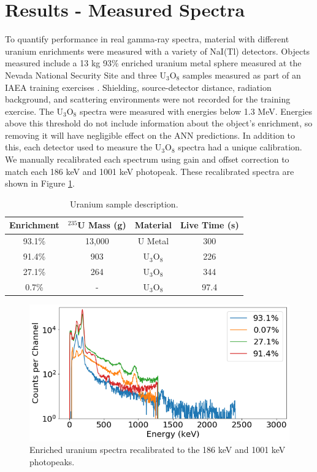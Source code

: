 \section{Results - Measured Spectra}

To quantify performance in real gamma-ray spectra, material with different uranium enrichments were measured with a variety of NaI(Tl) detectors. Objects measured include a 13 kg 93\% enriched uranium metal sphere \cite{Rothe1997} measured at the Nevada National Security Site and three U$_{3}$O$_{8}$ samples measured as part of an IAEA training exercises \cite{jacobstinnett_u3o8}. Shielding, source-detector distance, radiation background, and scattering environments were not recorded for the training exercise. The U$_{3}$O$_{8}$ spectra were measured with energies below 1.3 MeV. Energies above this threshold do not include information about the object's enrichment, so removing it will have negligible effect on the ANN predictions. In addition to this, each detector used to measure the U$_{3}$O$_{8}$ spectra had a unique calibration. We manually recalibrated each spectrum using gain and offset correction to match each 186 keV and 1001 keV photopeak. These recalibrated spectra are shown in Figure \ref{fig:measured_uranium_plots}.

\begin{table}[H]
\centering
\caption{Uranium sample description.}
\label{table:uranium_sample_description}
\begin{tabular}{cccc}
\hline
Enrichment & $^{235}$U Mass (g) & Material & Live Time (s)   \\ \hline
93.1\% & 13,000 & U Metal & 300 \\
91.4\% & 903 & U$_{3}$O$_{8}$ &  226\\
27.1\%  & 264 & U$_{3}$O$_{8}$ & 344 \\ 
0.7\% & - & U$_{3}$O$_{8}$ & 97.4 \\ \hline
\end{tabular}
\end{table}

\begin{figure}[H]
	\centering
	\includegraphics[width=0.8\linewidth]{images/measured_uranium_plots.png}
	\caption{Enriched uranium spectra recalibrated to the 186 keV and 1001 keV photopeaks.}
	\label{fig:measured_uranium_plots}
\end{figure}

